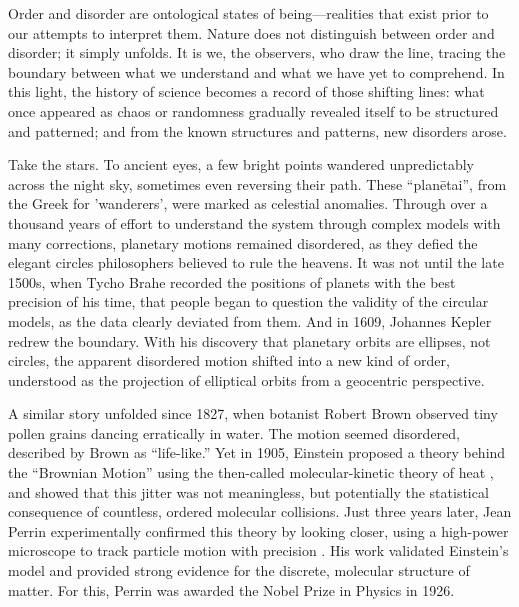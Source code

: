 Order and disorder are ontological states of being—realities that exist prior to our attempts to interpret them. Nature does not distinguish between order and disorder; it simply unfolds. It is we, the observers, who draw the line, tracing the boundary between what we understand and what we have yet to comprehend. In this light, the history of science becomes a record of those shifting lines: what once appeared as chaos or randomness gradually revealed itself to be structured and patterned; and from the known structures and patterns, new disorders arose.

Take the stars. To ancient eyes, a few bright points wandered unpredictably across the night sky, sometimes even reversing their path. These “planētai”, from the Greek for 'wanderers', were marked as celestial anomalies. Through over a thousand years of effort to understand the system through complex models with many corrections, planetary motions remained disordered, as they defied the elegant circles philosophers believed to rule the heavens. It was not until the late 1500s, when Tycho Brahe recorded the positions of planets with the best precision of his time, that people began to question the validity of the circular models, as the data clearly deviated from them. And in 1609, Johannes Kepler redrew the boundary. With his discovery that planetary orbits are ellipses, not circles, the apparent disordered motion shifted into a new kind of order, understood as the projection of elliptical orbits from a geocentric perspective.

A similar story unfolded since 1827, when botanist Robert Brown observed tiny pollen grains dancing erratically in water. The motion seemed disordered, described by Brown as “life-like.” Yet in 1905, Einstein proposed a theory behind the “Brownian Motion” using the then-called molecular-kinetic theory of heat \cite{UberMolekularkinetischenTheorie}, and showed that this jitter was not meaningless, but potentially the statistical consequence of countless, ordered molecular collisions. Just three years later, Jean Perrin experimentally confirmed this theory by looking closer, using a high-power microscope to track particle motion with precision \cite{r.BrownianMovementMolecular1911}. His work validated Einstein’s model and provided strong evidence for the discrete, molecular structure of matter. For this, Perrin was awarded the Nobel Prize in Physics in 1926.

